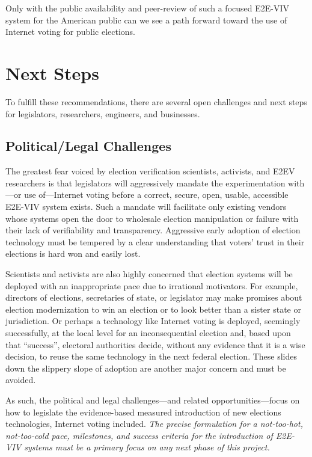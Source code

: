 Only with the public availability and peer-review of such a focused
E2E-VIV system for the American public can we see a path forward
toward the use of Internet voting for public elections.

\section{Next Steps}
\label{sec:next-steps}

To fulfill these recommendations, there are several open challenges
and next steps for legislators, researchers, engineers, and
businesses.

\subsection{Political/Legal Challenges}

The greatest fear voiced by election verification scientists,
activists, and E2EV researchers is that legislators will aggressively
mandate the experimentation with---or use of---Internet voting before
a correct, secure, open, usable, accessible E2E-VIV system
exists. Such a mandate will facilitate only existing vendors whose
systems open the door to wholesale election manipulation or failure
with their lack of verifiability and transparency. Aggressive early
adoption of election technology must be tempered by a clear
understanding that voters' trust in their elections is hard won and
easily lost.

Scientists and activists are also highly concerned that election
systems will be deployed with an inappropriate pace due to irrational
motivators. For example, directors of elections, secretaries of state,
or legislator may make promises about election modernization to win an
election or to look better than a sister state or jurisdiction. Or
perhaps a technology like Internet voting is deployed, seemingly
successfully, at the local level for an inconsequential election and,
based upon that ``success'', electoral authorities decide, without any
evidence that it is a wise decision, to reuse the same technology in
the next federal election. These slides down the slippery slope of
adoption are another major concern and must be avoided.

As such, the political and legal challenges---and related
opportunities---focus on how to legislate the evidence-based measured
introduction of new elections technologies, Internet voting
included. \emph{The precise formulation for a not-too-hot,
  not-too-cold pace, milestones, and success criteria for the
  introduction of E2E-VIV systems must be a primary focus on any next
  phase of this project.}

